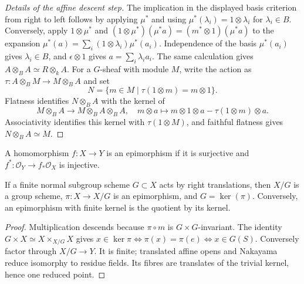 \begin{proof}[Details of the affine descent step]
The implication in the displayed basis criterion from right to left follows
by applying $\mu^*$ and using $\mu^*(\lambda_i)=1\otimes\lambda_i$ for
$\lambda_i\in B$. Conversely, apply $1\otimes\mu^*$ and
$(1\otimes\mu^*)(\mu^*a)=(m^*\otimes1)(\mu^*a)$ to the expansion
$\mu^*(a)=\sum_i(1\otimes\lambda_i)\mu^*(a_i)$. Independence of the basis
$\mu^*(a_i)$ gives $\lambda_i\in B$, and $\epsilon\otimes1$ gives
$a=\sum_i\lambda_i a_i$. The same calculation gives
$A\otimes_BA\simeq R\otimes_kA$. For a $G$-sheaf with module $M$, write the
action as $\tau:A\otimes_BM\to M\otimes_BA$ and set
\[
N=\{m\in M\mid\tau(1\otimes m)=m\otimes1\}.
\]
Flatness identifies $N\otimes_BA$ with the kernel of
\[
M\otimes_BA\to M\otimes_BA\otimes_BA,\quad
m\otimes a\mapsto m\otimes1\otimes a-\tau(1\otimes m)\otimes a.
\]
 Associativity identifies this kernel with $\tau(1\otimes M)$, and faithful
 flatness gives $N\otimes_BA\simeq M$.
\end{proof}

\begin{definition}
\label{mumford-def-group-scheme-epimorphism}
A homomorphism $f:X\to Y$ is an epimorphism if it is surjective and
$f^*:\mathcal O_Y\to f_*\mathcal O_X$ is injective.
\end{definition}

\begin{corollary}
\label{mumford-cor-finite-normal-quotient}
If a finite normal subgroup scheme $G\subset X$ acts by right translations,
then $X/G$ is a group scheme, $\pi:X\to X/G$ is an epimorphism, and
$G=\ker(\pi)$. Conversely, an epimorphism with finite kernel is the quotient
by its kernel.
\end{corollary}
\begin{proof}
Multiplication descends because $\pi\circ m$ is $G\times G$-invariant.
The identity $G\times X\simeq X\times_{X/G}X$ gives
$x\in\ker\pi\Longleftrightarrow\pi(x)=\pi(e)\Longleftrightarrow x\in G(S)$.
Conversely factor through $X/G\to Y$. It is finite; translated affine opens
and Nakayama reduce isomorphy to residue fields. Its fibres are translates of
the trivial kernel, hence one reduced point.
\end{proof}

